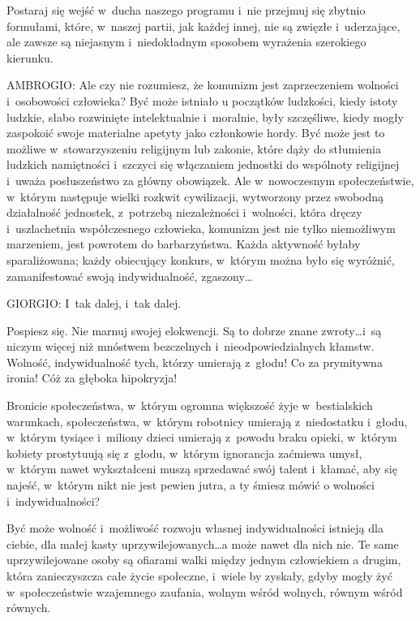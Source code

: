\documentclass[oneside,polish,11pt,sfheadings]{mwbk}
\begin{document}
 
Postaraj się wejść w~ducha naszego programu i~nie przejmuj się zbytnio formułami, które, w~naszej partii, jak każdej
innej, nie są zwięzłe i~uderzające, ale zawsze są niejasnym i~niedokładnym sposobem wyrażenia szerokiego kierunku. 




 
\noindent AMBROGIO: Ale czy nie rozumiesz, że komunizm jest zaprzeczeniem wolności i~osobowości człowieka? Być może istniało u
początków ludzkości, kiedy istoty ludzkie, słabo rozwinięte intelektualnie i~moralnie, były szczęśliwe, kiedy mogły
zaspokoić swoje materialne apetyty jako członkowie hordy. Być może jest to możliwe w~stowarzyszeniu religijnym lub
zakonie, które dąży do stłumienia ludzkich namiętności i~szczyci się włączaniem jednostki do wspólnoty religijnej i~uważa posłuszeństwo za główny obowiązek. Ale w~nowoczesnym społeczeństwie, w~którym następuje wielki rozkwit
cywilizacji, wytworzony przez swobodną działalność jednostek, z~potrzebą niezależności i~wolności, która dręczy i~uszlachetnia współczesnego człowieka, komunizm jest nie tylko niemożliwym marzeniem, jest powrotem do barbarzyństwa.
Każda aktywność byłaby sparaliżowana; każdy obiecujący konkurs, w~którym można było się wyróżnić, zamanifestować swoją
indywidualność, zgaszony\ldots 




 
\noindent GIORGIO: I~tak dalej, i~tak dalej. 

 
Pospiesz się. Nie marnuj swojej elokwencji. Są to dobrze znane zwroty\ldots i~są niczym więcej niż mnóstwem bezczelnych i~nieodpowiedzialnych kłamstw. Wolność, indywidualność tych, którzy umierają z~głodu! Co za prymitywna ironia! Cóż za
głęboka hipokryzja! 

 
Bronicie społeczeństwa, w~którym ogromna większość żyje w~bestialskich warunkach, społeczeństwa, w~którym robotnicy
umierają z~niedostatku i~głodu, w~którym tysiące i~miliony dzieci umierają z~powodu braku opieki, w~którym kobiety
prostytuują się z~głodu, w~którym ignorancja zaćmiewa umysł, w~którym nawet wykształceni muszą sprzedawać swój talent i~kłamać, aby się najeść, w~którym nikt nie jest pewien jutra, a ty śmiesz mówić o wolności i~indywidualności? 

 
Być może wolność i~możliwość rozwoju własnej indywidualności istnieją dla ciebie, dla małej kasty uprzywilejowanych\ldots a
może nawet dla nich nie. Te same uprzywilejowane osoby są ofiarami walki między jednym człowiekiem a drugim, która
zanieczyszcza całe życie społeczne, i~wiele by zyskały, gdyby mogły żyć w~społeczeństwie wzajemnego zaufania, wolnym
wśród wolnych, równym wśród równych. 
\end{document}
